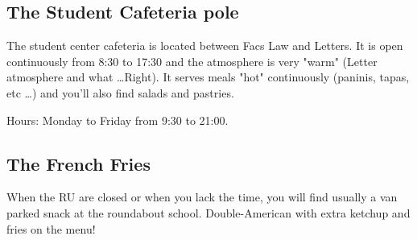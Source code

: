 \subsection {The Student Cafeteria pole}


The student center cafeteria is located between Facs Law and Letters.
It is open continuously from 8:30 to 17:30 and the atmosphere is very "warm" (Letter atmosphere and what \dots Right).
It serves meals "hot" continuously (paninis, tapas, etc \dots) and you'll also find salads and pastries.

Hours: Monday to Friday from 9:30 to 21:00.





\subsection{The French Fries}
When the RU are closed or when you lack the time, you will find usually a van parked snack at the roundabout school.
Double-American with extra ketchup and fries on the menu!

